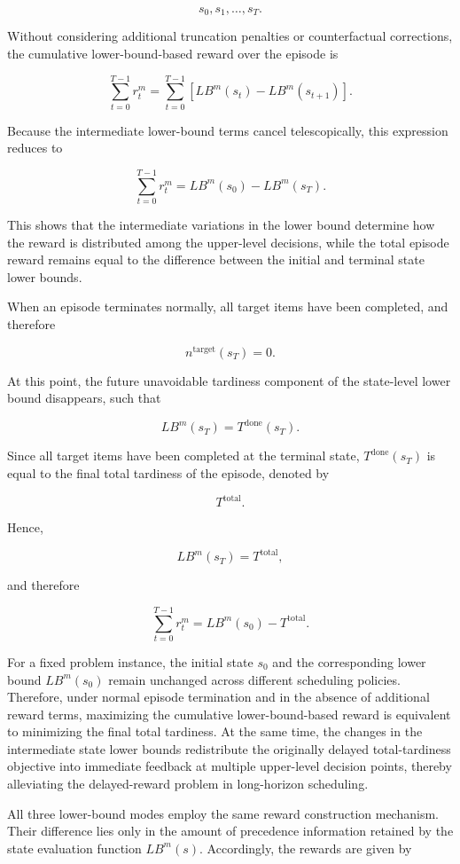 \[
s_0,
s_1,
\ldots,
s_T.
\]

Without considering additional truncation penalties or counterfactual
corrections, the cumulative lower-bound-based reward over the episode is

\[
\sum_{t=0}^{T-1}
r_t^m
=
\sum_{t=0}^{T-1}
\left[
LB^m(s_t)
-
LB^m(s_{t+1})
\right].
\]

Because the intermediate lower-bound terms cancel telescopically, this
expression reduces to

\[
\sum_{t=0}^{T-1}
r_t^m
=
LB^m(s_0)
-
LB^m(s_T).
\]

This shows that the intermediate variations in the lower bound determine how
the reward is distributed among the upper-level decisions, while the total
episode reward remains equal to the difference between the initial and terminal
state lower bounds.

When an episode terminates normally, all target items have been completed, and
therefore

\[
n^{\mathrm{target}}(s_T)=0.
\]

At this point, the future unavoidable tardiness component of the state-level
lower bound disappears, such that

\[
LB^m(s_T)
=
T^{\mathrm{done}}(s_T).
\]

Since all target items have been completed at the terminal state,
\(T^{\mathrm{done}}(s_T)\) is equal to the final total tardiness of the episode,
denoted by

\[
T^{\mathrm{total}}.
\]

Hence,

\[
LB^m(s_T)
=
T^{\mathrm{total}},
\]

and therefore

\[
\sum_{t=0}^{T-1}
r_t^m
=
LB^m(s_0)
-
T^{\mathrm{total}}.
\]

For a fixed problem instance, the initial state \(s_0\) and the corresponding
lower bound \(LB^m(s_0)\) remain unchanged across different scheduling
policies. Therefore, under normal episode termination and in the absence of
additional reward terms, maximizing the cumulative lower-bound-based reward is
equivalent to minimizing the final total tardiness. At the same time, the
changes in the intermediate state lower bounds redistribute the originally
delayed total-tardiness objective into immediate feedback at multiple
upper-level decision points, thereby alleviating the delayed-reward problem in
long-horizon scheduling.

All three lower-bound modes employ the same reward construction mechanism. Their
difference lies only in the amount of precedence information retained by the
state evaluation function \(LB^m(s)\). Accordingly, the rewards are given by

